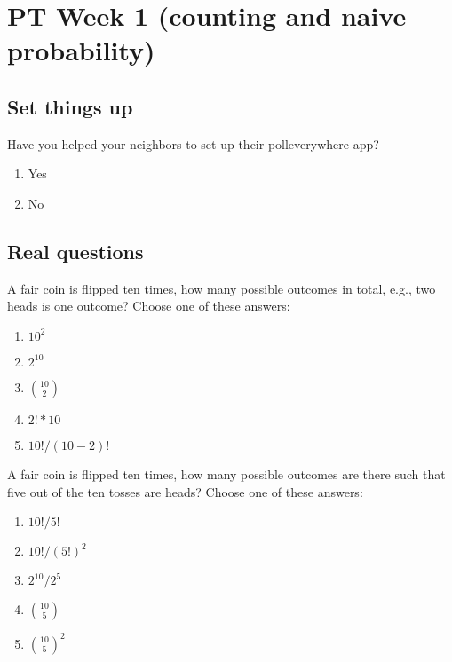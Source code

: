 \documentclass[poll_tutorial_format]{subfiles}
\begin{document}
	\maketitle
		\setcounter{section}{0}
	\section{PT Week 1 (counting and naive probability)}
	
	\subsection{Set things up}
	\label{sec:set-things-up}
	
	
	
	\setcounter{theorem}{-1}
	\begin{exercise}
		Have you helped your neighbors to set up their polleverywhere app?
		\begin{enumerate}
			\item Yes
			\item No
		\end{enumerate}
	\end{exercise}
	
	\subsection{Real questions}
	\label{sec:start-real-questions pt week1}
	\begin{exercise}
		A fair coin is flipped ten times, how many possible outcomes in total, e.g., two heads is one outcome?		
		Choose one of these answers: 
		\begin{enumerate}
			\item $10^2$
			\item $2^{10}$
			\item ${10\choose 2}$
			\item $2! * 10$
			\item $10!/(10-2)!$
		\end{enumerate}
	\end{exercise}
	
	
	\begin{exercise}
		A fair coin is flipped ten times, how many possible outcomes are there such that five out of the ten tosses are heads?				
		Choose one of these answers:
		\begin{enumerate}
			\item $10!/5!$
			\item $10!/(5!)^2$
			\item $2^{10}/2^{5}$
			\item ${10 \choose 5}$
			\item ${10 \choose 5}^2$
		\end{enumerate}
	\end{exercise}
\end{document}
